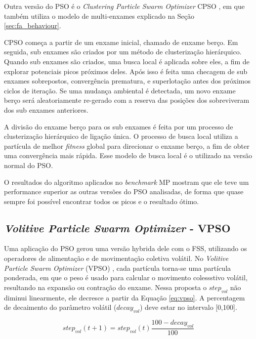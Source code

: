 Outra versão do PSO é o \textit{Clustering Particle Swarm Optimizer} CPSO \cite{yang2010clustering}, em que também utiliza o modelo de multi-enxames explicado na Seção \ref{sec:fa_behaviour}.

CPSO começa a partir de um enxame inicial, chamado de enxame berço. Em seguida, sub enxames são criados por um método de clusterização hierárquico. Quando sub enxames são criados, uma busca local é aplicada sobre eles, a fim de explorar potenciais picos próximos deles. Após isso é feita uma checagem de sub enxames sobrepostos, convergência prematura, e superlotação antes dos próximos ciclos de iteração. Se uma mudança ambiental é detectada, um novo enxame berço será aleatoriamente re-gerado com a reserva das posições dos sobreviveram dos sub enxames anteriores.

A divisão do enxame berço para os sub enxames é feita por um processo de clusterização hierárquico de ligação única. O processo de busca local utiliza a partícula de melhor \textit{fitness} global para direcionar o enxame berço, a fim de obter uma convergência mais rápida. Esse modelo de busca local é o utilizado na versão normal do PSO. 

O resultados do algoritmo aplicados no \textit{benchmark} MP mostram que ele teve um performance superior as outras versões do PSO analisadas, de forma que quase sempre foi possível encontrar todos os picos e o resultado ótimo.

\subsection{\textit{Volitive Particle Swarm Optimizer} - VPSO}
\label{sec:vpso}

Uma aplicação do PSO gerou uma versão hybrida dele com o FSS, utilizando os operadores de alimentação e de movimentação coletiva volátil. No \textit{Volitive Particle Swarm Optimizer} (VPSO) \cite{cavalcanti2011hybrid}, cada partícula torna-se uma partícula ponderada, em que o peso é usado para calcular o movimento colessstivo volátil, resultando na expansão ou contração do enxame. Nessa proposta o $step_{vol}$ não diminui linearmente, ele decresce a partir da Equação \ref{eq:vpso}. A percentagem de decaimento do parâmetro volátil ($decay_{vol}$) deve estar no intervalo [0,100].

\begin{equation}
\label{eq:vpso}
step_{vol}(t+1) = step_{vol}(t) \frac{100 - decay_{vol}}{100}
\end{equation}

